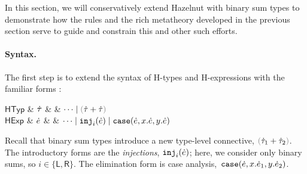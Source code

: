 \renewcommand{\thesumtypedef}{\theequation\alph{sumtypedef}}

\newcommand{\Define}[1]{(\refstepcounter{sumtypedef}\thesumtypedef\label{#1})}

In this section, we will conservatively extend Hazelnut with binary {sum
types} to demonstrate how the rules and the rich metatheory developed in
the previous section serve to guide and constrain this and other such
efforts.

\paragraph{Syntax.}
%
The first step is to extend the syntax of H-types and H-expressions
with the familiar forms \cite{pfpl}:\vspace{-3px}
\begin{grammar}
$\mathsf{HTyp}$ & $\dot{\tau}$ & \bnfas & $\cdots \bnfalt \tsum{\htau}{\htau}$
\\
$\mathsf{HExp}$ & $\dot{e}$ & \bnfas & $\cdots
\mathrel{\mid} \mathtt{inj}_{i}({\dot{e}})
\mathrel{\mid} \mathtt{case}({\dot{e}},{x}.{\dot{e}},{y}.{\dot{e}})$
\end{grammar}\vspace{-3px}
Recall that binary sum types introduce a new type-level connective,
$\tsum{\htau_1}{\htau_2}$. The introductory forms are the \emph{injections},
$\mathtt{inj}_{i}({\dot{e}})$; here, we consider only binary sums, so $i\in\{\mathsf{L}, \mathsf{R}\}$.
The elimination form is case
analysis,~$\mathtt{case}({\dot{e}},{x}.{\dot{e}_1},{y}.{\dot{e}_2})$.

